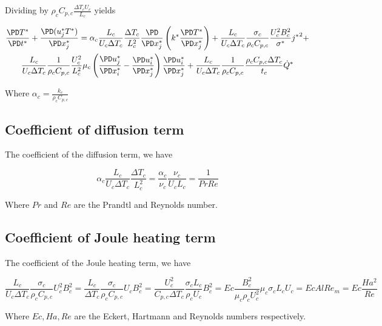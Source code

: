 \documentclass[11pt]{article}
\begin{document}
Dividing by $\rho_c C_{p,c} \frac{\Delta T_c U_c}{L_c}$ yields

\begin{multline}
	\frac{\PD T^*}{\PD t^*} +
	\frac{\PD (u_j^* T^*)}{\PD x_j^*}
	=
	\alpha_c
	\frac{L_c}{U_c \Delta T_c}
	\frac{\Delta T_c}{L_c^2}
	\frac{\PD}{\PD x_j^*}
	\left( k^* \frac{\PD T^*}{\PD x_j^*} \right) +
	\frac{L_c}{U_c \Delta T_c}
	\frac{\sigma_c}{\rho_c C_{p,c}}
	\frac{U_c^2 B_c^2}{\sigma^*} {j^*}^2 + \\
	\frac{L_c}{U_c \Delta T_c}
	\frac{1}{\rho_c C_{p,c}}
	\frac{U_c^2}{L_c^2}\mu_c
	\left( \frac{\PD u_j^*}{\PD x_i^*} - \frac{\PD u_i^*}{\PD x_j^*} \right)
	\frac{\PD u_i^*}{\PD x_j^*} +
	\frac{L_c}{U_c \Delta T_c}
	\frac{1}{\rho_c C_{p,c}}
	\frac{\rho_c C_{p,c} \Delta T_c}{t_c}
	\dot{Q}^*
\end{multline}

Where $\alpha_c = \frac{k_c}{\rho_c C_{p,c}}$

\subsection{Coefficient of diffusion term}

The coefficient of the diffusion term, we have

\begin{equation}
\alpha_c  \frac{L_c}{U_c \Delta T_c} \frac{\Delta T_c}{L_c^2} =
\frac{\alpha_c}{\nu_c} \frac{\nu_c}{U_c L_c} = \frac{1}{Pr Re}
\end{equation}

Where $Pr$ and $Re$ are the Prandtl and Reynolds number.

\subsection{Coefficient of Joule heating term}

The coefficient of the Joule heating term, we have

\begin{equation}
\frac{L_c}{U_c \Delta T_c} \frac{\sigma_c}{\rho_c C_{p,c}} U_c^2 B_c^2 =
\frac{L_c}{\Delta T_c} \frac{\sigma_c}{\rho_c C_{p,c}} U_c B_c^2 =
\frac{U_c^2}{C_{p,c} \Delta T_c} \frac{\sigma_c L_c}{\rho_c U_c} B_c^2 =
Ec \frac{B_c^2}{\mu_c \rho_c U_c^2} \mu_c \sigma_c L_c U_c =
Ec Al Re_m = Ec \frac{Ha^2}{Re}
\end{equation}

Where $Ec,Ha,Re$ are the Eckert, Hartmann and Reynolds numbers respectively.
\end{document}
